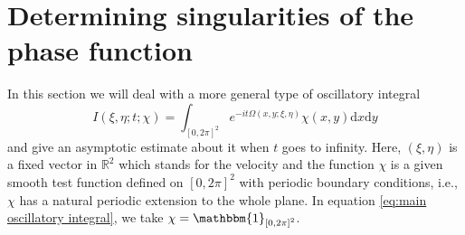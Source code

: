 \documentclass[12pt]{amsart}
\newcommand{\R}{\mathbb{R}}
\def\d{\mathrm{d}}
\begin{document}
\section{Determining singularities of the phase function}\label{sec2}









In this section we will deal with a more general type of oscillatory integral
\begin{equation}\label{def: General oscillatory integral on the torus}
    I\left(\xi,\eta;t;\chi\right)=\int_{\left[0,2\pi\right]^{2}}e^{-it\Omega\left(x,y;\xi,\eta\right)}\chi\left(x,y\right)\d x\d y
\end{equation}
and give an asymptotic estimate about it when $t$ goes to infinity. Here, $\left(\xi,\eta\right)$ is a fixed vector in $\R^{2}$ which stands for the velocity and the function $\chi$ is a given smooth test function defined on $\left[0,2\pi\right]^{2}$ with periodic boundary conditions, i.e., $\chi$ has a natural periodic extension to the whole plane. In equation \eqref{eq:main oscillatory integral}, we take $\chi=\mathbbm{1}_{\left[0,2\pi\right]^{2}}$. 
\end{document}
